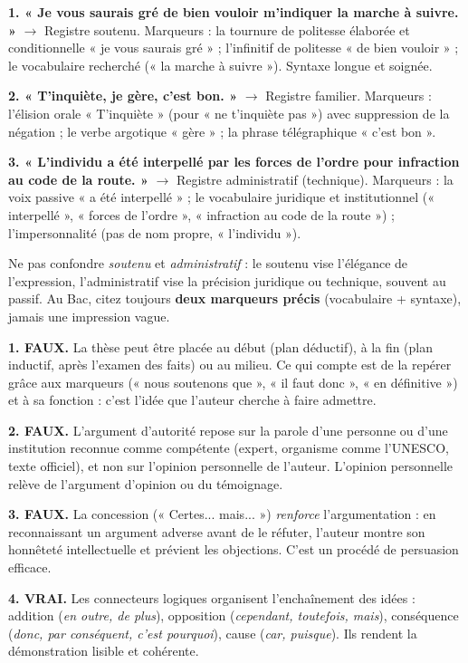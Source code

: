 \documentclass[11pt]{article}
\newcommand{\cle}[1]{{\popxbold\color{popdark}#1}}
\begin{document}
\begin{corrige}
\textbf{1. « Je vous saurais gré de bien vouloir m'indiquer la marche à suivre. »} $\rightarrow$ Registre \cle{soutenu}. Marqueurs : la tournure de politesse élaborée et conditionnelle « je vous saurais gré » ; l'infinitif de politesse « de bien vouloir » ; le vocabulaire recherché (« la marche à suivre »). Syntaxe longue et soignée.

\textbf{2. « T'inquiète, je gère, c'est bon. »} $\rightarrow$ Registre \cle{familier}. Marqueurs : l'élision orale « T'inquiète » (pour « ne t'inquiète pas ») avec suppression de la négation ; le verbe argotique « gère » ; la phrase télégraphique « c'est bon ».

\textbf{3. « L'individu a été interpellé par les forces de l'ordre pour infraction au code de la route. »} $\rightarrow$ Registre \cle{administratif} (technique). Marqueurs : la voix passive « a été interpellé » ; le vocabulaire juridique et institutionnel (« interpellé », « forces de l'ordre », « infraction au code de la route ») ; l'impersonnalité (pas de nom propre, « l'individu »).
\end{corrige}

\begin{attention}
Ne pas confondre \emph{soutenu} et \emph{administratif} : le soutenu vise l'élégance de l'expression, l'administratif vise la précision juridique ou technique, souvent au passif. Au Bac, citez toujours \textbf{deux marqueurs précis} (vocabulaire + syntaxe), jamais une impression vague.
\end{attention}

\begin{corrige}
\textbf{1. FAUX.} La thèse peut être placée au début (plan déductif), à la fin (plan inductif, après l'examen des faits) ou au milieu. Ce qui compte est de la repérer grâce aux marqueurs (« nous soutenons que », « il faut donc », « en définitive ») et à sa fonction : c'est l'idée que l'auteur cherche à faire admettre.

\textbf{2. FAUX.} L'argument d'autorité repose sur la parole d'une personne ou d'une institution reconnue comme compétente (expert, organisme comme l'UNESCO, texte officiel), et non sur l'opinion personnelle de l'auteur. L'opinion personnelle relève de l'argument d'opinion ou du témoignage.

\textbf{3. FAUX.} La concession (« Certes... mais... ») \emph{renforce} l'argumentation : en reconnaissant un argument adverse avant de le réfuter, l'auteur montre son honnêteté intellectuelle et prévient les objections. C'est un procédé de persuasion efficace.

\textbf{4. VRAI.} Les connecteurs logiques organisent l'enchaînement des idées : addition (\emph{en outre, de plus}), opposition (\emph{cependant, toutefois, mais}), conséquence (\emph{donc, par conséquent, c'est pourquoi}), cause (\emph{car, puisque}). Ils rendent la démonstration lisible et cohérente.
\end{corrige}
\end{document}
